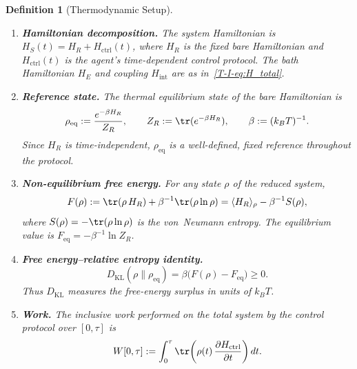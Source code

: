 \documentclass[12pt,a4paper,openany]{book}
\newtheorem{definition}[theorem]{Definition}
\begin{document}
\begin{definition}[Thermodynamic Setup]
\label{T-I-def:thermo_setup}
\leavevmode
\begin{enumerate}
\item \textbf{Hamiltonian decomposition.}
  The system Hamiltonian is
  $H_S(t) = H_R + H_{\mathrm{ctrl}}(t)$,
  where $H_R$ is the \emph{fixed} bare Hamiltonian and
  $H_{\mathrm{ctrl}}(t)$ is the agent's time-dependent
  control protocol.
  The bath Hamiltonian $H_E$ and coupling $H_{\mathrm{int}}$
  are as in~\eqref{T-I-eq:H_total}.

\item \textbf{Reference state.}
  The thermal equilibrium state of the bare Hamiltonian is
  \begin{equation}
  \label{T-I-eq:rho_eq}
  \rho_{\mathrm{eq}} := \frac{e^{-\beta H_R}}{Z_R},
  \qquad Z_R := \tr(e^{-\beta H_R}),
  \qquad \beta := (k_B T)^{-1}.
  \end{equation}
  Since $H_R$ is time-independent, $\rho_{\mathrm{eq}}$ is a
  well-defined, fixed reference throughout the protocol.

\item \textbf{Non-equilibrium free energy.}
  For any state $\rho$ of the reduced system,
  \begin{equation}
  \label{T-I-eq:F_neq}
  F(\rho) := \tr(\rho\, H_R) + \beta^{-1}\tr(\rho\ln\rho)
  = \langle H_R \rangle_\rho - \beta^{-1} S(\rho),
  \end{equation}
  where $S(\rho) = -\tr(\rho\ln\rho)$ is the von~Neumann entropy.
  The equilibrium value is $F_{\mathrm{eq}} = -\beta^{-1}\ln Z_R$.

\item \textbf{Free energy--relative entropy identity.}
  \begin{equation}
  \label{T-I-eq:DKL_F}
  D_{\mathrm{KL}}(\rho \| \rho_{\mathrm{eq}})
  = \beta\bigl(F(\rho) - F_{\mathrm{eq}}\bigr) \geq 0.
  \end{equation}
  Thus $D_{\mathrm{KL}}$ measures the free-energy surplus in
  units of $k_B T$.

\item \textbf{Work.}
  The inclusive work performed on the total system by the control protocol
  over $[0,\tau]$ is
  \begin{equation}
  \label{T-I-eq:work}
  W[0,\tau] := \int_0^\tau
  \tr\!\left(\rho(t)\,
  \frac{\partial H_{\mathrm{ctrl}}}{\partial t}\right) dt.
  \end{equation}


\end{enumerate}
\end{definition}
\end{document}
